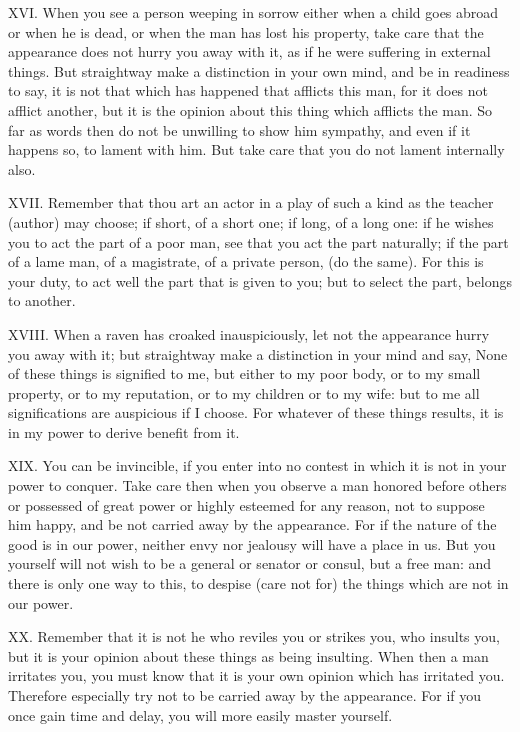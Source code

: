 XVI. When you see a person weeping in sorrow either when a child goes abroad or when he is dead, or when the man has lost his property, take care that the appearance does not hurry you away with it, as if he were suffering in external things. But straightway make a distinction in your own mind, and be in readiness to say, it is not that which has happened that afflicts this man, for it does not afflict another, but it is the opinion about this thing which afflicts the man. So far as words then do not be unwilling to show him sympathy, and even if it happens so, to lament with him. But take care that you do not lament internally also.



XVII. Remember that thou art an actor in a play of such a kind as the teacher (author) may choose; if short, of a short one; if long, of a long one: if he wishes you to act the part of a poor man, see that you act the part naturally; if the part of a lame man, of a magistrate, of a private person, (do the same). For this is your duty, to act well the part that is given to you; but to select the part, belongs to another.



XVIII. When a raven has croaked inauspiciously, let not the appearance hurry you away with it; but straightway make a distinction in your mind and say, None of these things is signified to me, but either to my poor body, or to my small property, or to my reputation, or to my children or to my wife: but to me all significations are auspicious if I choose. For whatever of these things results, it is in my power to derive benefit from it.



XIX. You can be invincible, if you enter into no contest in which it is not in your power to conquer. Take care then when you observe a man honored before others or possessed of great power or highly esteemed for any reason, not to suppose him happy, and be not carried away by the appearance. For if the nature of the good is in our power, neither envy nor jealousy will have a place in us. But you yourself will not wish to be a general or senator or consul, but a free man: and there is only one way to this, to despise (care not for) the things which are not in our power.



XX. Remember that it is not he who reviles you or strikes you, who insults you, but it is your opinion about these things as being insulting. When then a man irritates you, you must know that it is your own opinion which has irritated you. Therefore especially try not to be carried away by the appearance. For if you once gain time and delay, you will more easily master yourself.



